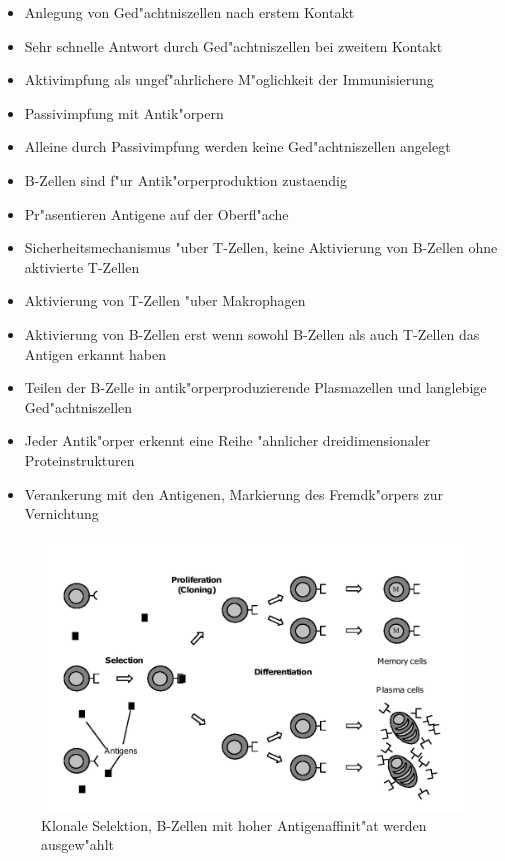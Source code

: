 \documentclass[10pt, a4]{seminar}
\begin{document}
\begin{slide}
\begin{itemize}
\item Anlegung von Ged"achtniszellen nach erstem Kontakt
\item Sehr schnelle Antwort durch Ged"achtniszellen bei zweitem Kontakt
\item Aktivimpfung als ungef"ahrlichere M"oglichkeit der Immunisierung
\item Passivimpfung mit Antik"orpern
\item Alleine durch Passivimpfung werden keine Ged"achtniszellen angelegt
\end{itemize}
\vfill
\end{slide}


\begin{slide}
\begin{itemize}
\item B-Zellen sind f"ur Antik"orperproduktion zustaendig
\item Pr"asentieren Antigene auf der Oberfl"ache
\item Sicherheitsmechanismus "uber T-Zellen, keine Aktivierung von B-Zellen ohne aktivierte T-Zellen
\item Aktivierung von T-Zellen "uber Makrophagen
\item Aktivierung von B-Zellen erst wenn sowohl B-Zellen als auch T-Zellen das Antigen erkannt haben
\item Teilen der B-Zelle in antik"orperproduzierende Plasmazellen und langlebige Ged"achtniszellen
\item Jeder Antik"orper erkennt eine Reihe "ahnlicher dreidimensionaler Proteinstrukturen
\item Verankerung mit den Antigenen, Markierung des Fremdk"orpers zur Vernichtung
\end{itemize}
\vfill
\end{slide}


\begin{slide}

\begin{figure}[h]
\includegraphics[scale=0.25]{immuncloning.png}
\caption{Klonale Selektion, B-Zellen mit hoher Antigenaffinit"at werden ausgew"ahlt}
\end{figure}
\vfill
\end{slide}
\end{document}
